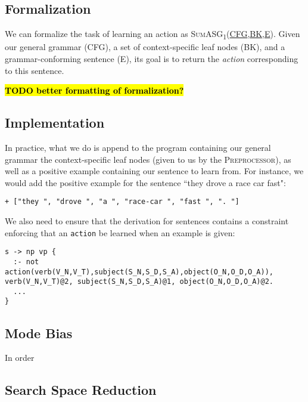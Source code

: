 \subsection{Formalization}

We can formalize the task of learning an action as \textsc{SumASG\textsubscript{1}(\underline{CFG},\underline{BK},\underline{E})}. Given our general grammar (\textsc{CFG}), a set of context-specific leaf nodes (\textsc{BK}), and a grammar-conforming sentence (\textsc{E}), its goal is to return the \textit{action} corresponding to this sentence.

\textcolor{red}{\textbf{\hl{TODO better formatting of formalization?}}}

\subsection{Implementation}

In practice, what we do is append to the program containing our general grammar the context-specific leaf nodes (given to us by the \textsc{Preprocessor}), as well as a positive example containing our sentence to learn from. For instance, we would add the positive example for the sentence ``they drove a race car fast":

\begin{displayquote}
\begin{lstlisting}
+ ["they ", "drove ", "a ", "race-car ", "fast ", ". "]
\end{lstlisting}
\end{displayquote}

We also need to ensure that the derivation for sentences contains a constraint enforcing that an \texttt{action} be learned when an example is given:

\begin{displayquote}
\begin{lstlisting}
s -> np vp {
  :- not action(verb(V_N,V_T),subject(S_N,S_D,S_A),object(O_N,O_D,O_A)), verb(V_N,V_T)@2, subject(S_N,S_D,S_A)@1, object(O_N,O_D,O_A)@2.
  ...
}
\end{lstlisting}
\end{displayquote}

\subsection{Mode Bias}

In order 

\subsection{Search Space Reduction}

